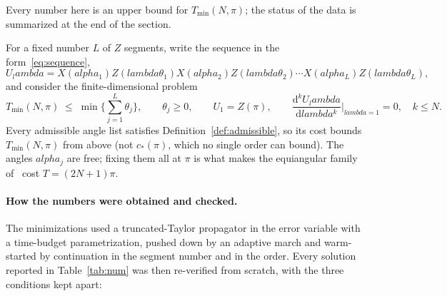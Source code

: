 \documentclass[%
  aps,
  pra,
  preprint,
  superscriptaddress,
  amsmath,amssymb,
  nofootinbib,
  floatfix,
]{revtex4-2}
\def\lambda{lambda}\def\tau{tau}\def\phi{phi}\def\alpha{alpha}%
\theoremstyle{definition}
\theoremstyle{remark}
\newcommand{\cstar}{c_*}
\begin{document}
Every number here is an upper bound for $T_{\min}(N,\pi)$; the status of the data is summarized at the end of the section.

For a fixed number $L$ of $Z$ segments, write the sequence in the form~\eqref{eq:sequence},
\[
U_\lambda
=X(\alpha_1)Z(\lambda\theta_1)X(\alpha_2)Z(\lambda\theta_2)\cdots X(\alpha_L)Z(\lambda\theta_L),
\]
and consider the finite-dimensional problem
\begin{equation}
T_{\min}(N,\pi)\;\le\;\min\Big\{\sum_{j=1}^L\theta_j\Big\} ,
\qquad
\theta_j\ge0,
\qquad
U_1=Z(\pi),
\qquad
\frac{\mathrm{d}^kU_\lambda}{\mathrm{d}\lambda^k}\Big|_{\lambda=1}=0,\quad k\le N .
\label{eq:numproblem}
\end{equation}
Every admissible angle list satisfies Definition~\ref{def:admissible}, so its cost bounds $T_{\min}(N,\pi)$ from above (not $\cstar(\pi)$, which no single order can bound). The angles $\alpha_j$ are free; fixing them all at $\pi$ is what makes the equiangular family of~\cite{Low2014} cost $T=(2N+1)\pi$.

\paragraph{How the numbers were obtained and checked.}
The minimizations used a truncated-Taylor propagator in the error variable with a
time-budget parametrization, pushed down by an adaptive march and
warm-started by continuation in the segment number and in the order. Every solution reported in
Table~\ref{tab:num} was then re-verified from scratch, with the three conditions kept apart:
\end{document}
